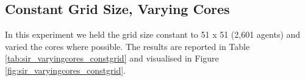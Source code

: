 \subsection{Constant Grid Size, Varying Cores}
In this experiment we held the grid size constant to 51 x 51 (2,601 agents) and varied the cores where possible. The results are reported in Table \ref{tab:sir_varyingcores_constgrid} and visualised in Figure \ref{fig:sir_varyingcores_constgrid}.

%		
%		
%		
